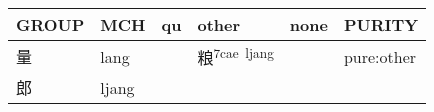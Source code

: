 \documentclass[14pt,a4paper]{scrartcl}
\begin{document}
\begin{longtable}[c]{@{}llllll@{}}
\toprule
\begin{minipage}[b]{0.14\columnwidth}\raggedright\strut
GROUP
\strut\end{minipage} &
\begin{minipage}[b]{0.14\columnwidth}\raggedright\strut
MCH
\strut\end{minipage} &
\begin{minipage}[b]{0.14\columnwidth}\raggedright\strut
qu
\strut\end{minipage} &
\begin{minipage}[b]{0.14\columnwidth}\raggedright\strut
other
\strut\end{minipage} &
\begin{minipage}[b]{0.14\columnwidth}\raggedright\strut
none
\strut\end{minipage} &
\begin{minipage}[b]{0.14\columnwidth}\raggedright\strut
PURITY
\strut\end{minipage}\tabularnewline
\midrule
\endhead
\begin{minipage}[t]{0.14\columnwidth}\raggedright\strut
量
\strut\end{minipage} &
\begin{minipage}[t]{0.14\columnwidth}\raggedright\strut
lang
\strut\end{minipage} &
\begin{minipage}[t]{0.14\columnwidth}\raggedright\strut
\strut\end{minipage} &
\begin{minipage}[t]{0.14\columnwidth}\raggedright\strut
粮\textsuperscript{7cae~ljang}
\strut\end{minipage} &
\begin{minipage}[t]{0.14\columnwidth}\raggedright\strut
\strut\end{minipage} &
\begin{minipage}[t]{0.14\columnwidth}\raggedright\strut
pure:other
\strut\end{minipage}\tabularnewline
\begin{minipage}[t]{0.14\columnwidth}\raggedright\strut
郎
\strut\end{minipage} &
\begin{minipage}[t]{0.14\columnwidth}\raggedright\strut
ljang
\strut\end{minipage} &
\begin{minipage}[t]{0.14\columnwidth}\raggedright\strut
\strut\end{minipage} &

\end{longtable}
\end{document}
